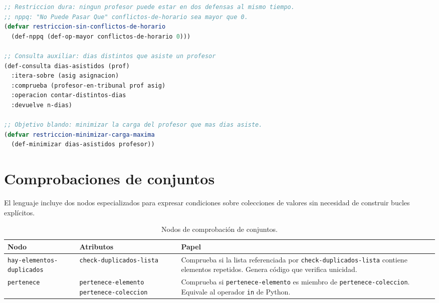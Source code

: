 \documentclass[12pt,a4paper]{report}
\begin{document}
\begin{lstlisting}[language=CommonLisp,
  caption={Restriccion dura y objetivo de minimizacion.}]
;; Restriccion dura: ningun profesor puede estar en dos defensas al mismo tiempo.
;; nppq: "No Puede Pasar Que" conflictos-de-horario sea mayor que 0.
(defvar restriccion-sin-conflictos-de-horario
  (def-nppq (def-op-mayor conflictos-de-horario 0)))

;; Consulta auxiliar: dias distintos que asiste un profesor
(def-consulta dias-asistidos (prof)
  :itera-sobre (asig asignacion)
  :comprueba (profesor-en-tribunal prof asig)
  :operacion contar-distintos-dias
  :devuelve n-dias)

;; Objetivo blando: minimizar la carga del profesor que mas dias asiste.
(defvar restriccion-minimizar-carga-maxima
  (def-minimizar dias-asistidos profesor))
\end{lstlisting}


\section{Comprobaciones de conjuntos}
\label{sec:comprobaciones}

El lenguaje incluye dos nodos especializados para expresar condiciones
sobre colecciones de valores sin necesidad de construir bucles explícitos.


\begin{table}[h!]
\centering
\caption{Nodos de comprobación de conjuntos.}
\label{tab:comprobaciones}
\renewcommand{\arraystretch}{1.3}
\begin{tabular}{p{4.8cm} p{4.5cm} p{5.5cm}}
\hline
\textbf{Nodo} & \textbf{Atributos} & \textbf{Papel} \\
\hline
\texttt{hay-elementos-duplicados}
  & \texttt{check-duplicados-lista}
  & Comprueba si la lista referenciada por
    \texttt{check-duplicados-lista} contiene elementos
    repetidos.  Genera código que verifica unicidad. \\
\hline
\texttt{pertenece}
  & \texttt{pertenece-elemento}\newline
    \texttt{pertenece-coleccion}
  & Comprueba si \texttt{pertenece-elemento} es miembro de
    \texttt{pertenece-coleccion}.  Equivale al operador
    \texttt{in} de Python. \\
\hline
\end{tabular}
\end{table}
\end{document}
